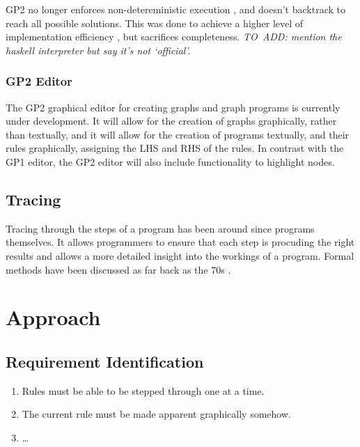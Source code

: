\documentclass{UoYCSproject}
\begin{document}
GP2 no longer enforces non-detereministic execution \cite[p. 15]{gp2_ide}, and doesn't backtrack to reach all possible solutions. This was done to achieve a higher level of implementation efficiency \cite[p. 15]{chris_compiler}, but sacrifices completeness.
\emph{TO~ADD: mention the haskell interpreter but say it's not `official'.} %

\subsection{GP2 Editor}
The GP2 graphical editor for creating graphs and graph programs is currently under development. It will allow for the creation of graphs graphically, rather than textually, and it will allow for the creation of programs textually, and their rules graphically, assigning the LHS and RHS of the rules. In contrast with the GP1 editor, the GP2 editor will also include functionality to highlight nodes.

\section{Tracing}
Tracing through the steps of a program has been around since programs themselves. %
It allows programmers to ensure that each step is procuding the right results and allows a more detailed insight into the workings of a program. Formal methods have been discussed as far back as the 70s \cite{psych_debug, code_walkthroughs}.




\chapter{Approach}
\section{Requirement Identification}
\begin{enumerate}
	\item Rules must be able to be stepped through one at a time.
 	\item The current rule must be made apparent graphically somehow.
	\item \ldots
\end{enumerate}
\end{document}
